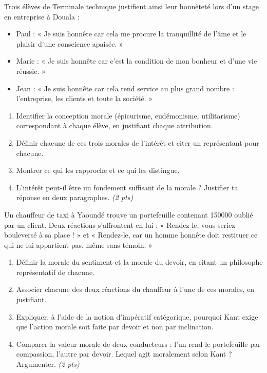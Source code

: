 \documentclass[11pt]{article}
\begin{document}
\begin{exercice}
Trois élèves de Terminale technique justifient ainsi leur honnêteté lors d'un stage en entreprise à Douala :
\begin{itemize}
\item Paul : « Je suis honnête car cela me procure la tranquillité de l'âme et le plaisir d'une conscience apaisée. »
\item Marie : « Je suis honnête car c'est la condition de mon bonheur et d'une vie réussie. »
\item Jean : « Je suis honnête car cela rend service au plus grand nombre : l'entreprise, les clients et toute la société. »
\end{itemize}
\begin{enumerate}
\item Identifier la conception morale (épicurisme, eudémonisme, utilitarisme) correspondant à chaque élève, en justifiant chaque attribution.
\item Définir chacune de ces trois morales de l'intérêt et citer un représentant pour chacune.
\item Montrer ce qui les rapproche et ce qui les distingue.
\item L'intérêt peut-il être un fondement suffisant de la morale ? Justifier ta réponse en deux paragraphes. \textit{(2 pts)}
\end{enumerate}
\end{exercice}

\begin{exercice}
Un chauffeur de taxi à Yaoundé trouve un portefeuille contenant \SI{150000}{} oublié par un client. Deux réactions s'affrontent en lui : « Rendez-le, vous seriez bouleversé à sa place ! » et « Rendez-le, car un homme honnête doit restituer ce qui ne lui appartient pas, même sans témoin. »
\begin{enumerate}
\item Définir la morale du sentiment et la morale du devoir, en citant un philosophe représentatif de chacune.
\item Associer chacune des deux réactions du chauffeur à l'une de ces morales, en justifiant.
\item Expliquer, à l'aide de la notion d'impératif catégorique, pourquoi Kant exige que l'action morale soit faite par devoir et non par inclination.
\item Comparer la valeur morale de deux conducteurs : l'un rend le portefeuille par compassion, l'autre par devoir. Lequel agit moralement selon Kant ? Argumenter. \textit{(2 pts)}
\end{enumerate}
\end{exercice}
\end{document}
